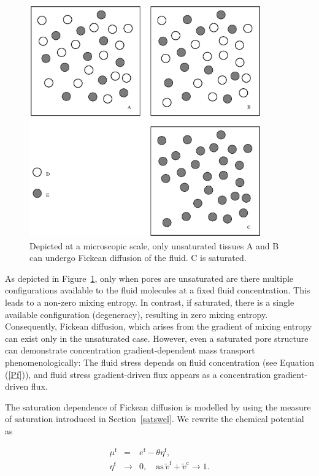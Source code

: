 \begin{figure}
\centering
{}
\includegraphics[width=10.00cm]{images/saturation.eps}
\caption{Depicted at a microscopic scale, only unsaturated tissues A
  and B can undergo Fickean diffusion of the fluid. C is saturated.}
\label{fick_fig}
\end{figure}

As depicted in Figure~\ref{fick_fig}, only when pores are unsaturated
are there multiple configurations 
available to the fluid molecules at a fixed fluid concentration.  This
leads to a non-zero mixing entropy. In contrast, if saturated, there
is a single available configuration (degeneracy), resulting in
zero mixing entropy. Consequently, Fickean diffusion, which arises
from the gradient of mixing entropy can exist only in the unsaturated
case. However, even a saturated pore structure can demonstrate
concentration gradient-dependent mass transport phenomenologically: The
fluid stress depends on fluid concentration (see Equation (\ref{Pf})),
and fluid stress gradient-driven flux appears as a concentration
gradient-driven flux.

The saturation dependence of Fickean diffusion is modelled by using
the measure of saturation introduced in Section~\ref{satswel}. We
rewrite the chemical potential as

\begin{eqnarray}
\mu^\mathrm{f} &=&  
e^\mathrm{f} - \theta\eta^\mathrm{f},\nonumber\\
\eta^\mathrm{f} &\to& 0, \quad \mbox{as}\, \tilde{v}^\mathrm{f} +
\tilde{v}^\mathrm{c} \to 1.
\label{fickeanmobility}
\end{eqnarray}


